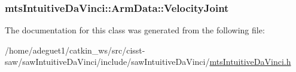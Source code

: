 \hypertarget{classmts_intuitive_da_vinci_1_1_arm_data_a664aeae6730eb511571774698f962def}{
\subsubsection[{Velocity\-Joint}]{ mts\-Intuitive\-Da\-Vinci\-::\-Arm\-Data\-::\-Velocity\-Joint}}\label{classmts_intuitive_da_vinci_1_1_arm_data_a664aeae6730eb511571774698f962def}


The documentation for this class was generated from the following file\-:\begin{DoxyCompactItemize}
\item 
/home/adeguet1/catkin\-\_\-ws/src/cisst-\/saw/saw\-Intuitive\-Da\-Vinci/include/saw\-Intuitive\-Da\-Vinci/\hyperlink{mts_intuitive_da_vinci_8h}{mts\-Intuitive\-Da\-Vinci.\-h}\end{DoxyCompactItemize}
